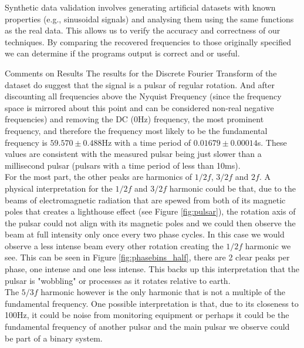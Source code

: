 \documentclass[reqno]{amsart}
\makeatletter
\renewcommand\subsection{\@startsection{subsection}{2}%
  \z@{.5\linespacing\@plus.7\linespacing}{-.5em}%
  {\normalfont\scshape\justify}}
\numberwithin{equation}{section}
\numberwithin{figure}{section}
\makeatother
\begin{document}
Synthetic data validation involves generating artificial datasets with known properties (e.g., sinusoidal signals) and analysing them using the same functions as the real data. This allows us to verify the accuracy and correctness of our techniques. By comparing the recovered frequencies to those originally specified we can determine if the programs output is correct and or useful.

\subsection{Comments on Results}
The results for the Discrete Fourier Transform of the dataset do suggest that the signal is a pulsar of regular rotation. And after discounting all frequencies above the Nyquist Frequency (since the frequency space is mirrored about this point and can be considered non-real negative frequencies) and removing the DC (0Hz) frequency, the most prominent frequency, and therefore the frequency most likely to be the fundamental frequency is $59.570 \pm 0.488$Hz with a time period of $0.01679 \pm 0.00014$s. These values are consistent with the measured pulsar being just slower than a millisecond pulsar (pulsars with a time period of less than 10ms). \\

For the most part, the other peaks are harmonics of $1/2f$, $3/2f$ and $2f$. A physical interpretation for the $1/2f$ and $3/2f$ harmonic could be that, due to the beams of electromagnetic radiation that are spewed from both of its magnetic poles that creates a lighthouse effect (see Figure \ref{fig:pulsar}), the rotation axis of the pulsar could not align with its magnetic poles and we could then observe the beam at full intensity only once every two phase cycles. In this case we would observe a less intense beam every other rotation creating the $1/2f$ harmonic we see. This can be seen in Figure \ref{fig:phasebins_half}, there are 2 clear peaks per phase, one intense and one less intense. This backs up this interpretation that the pulsar is "wobbling" or processes as it rotates relative to earth. \\

The $5/3f$ harmonic however is the only harmonic that is not a multiple of the fundamental frequency. One possible interpretation is that, due to its closeness to 100Hz, it could be noise from monitoring equipment or perhaps it could be the fundamental frequency of another pulsar and the main pulsar we observe could be part of a binary system.
\end{document}
